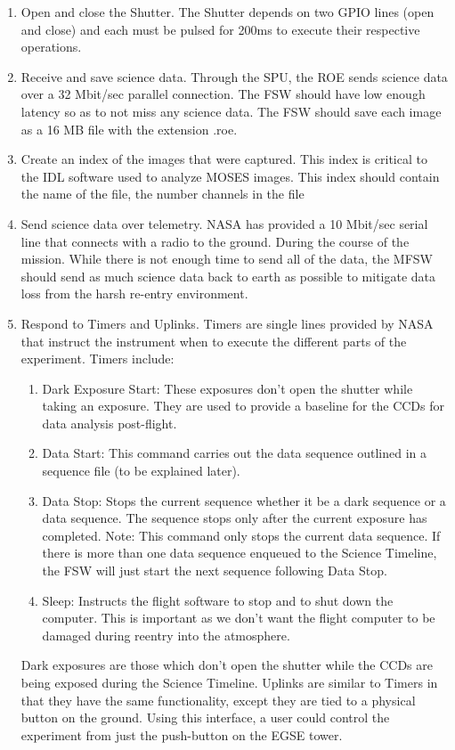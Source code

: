 \begin{enumerate}
  \item Open and close the Shutter. The Shutter depends on two GPIO lines (open and close) and each must be pulsed for 200ms to execute their respective operations.

  \item Receive and save science data. Through the SPU, the ROE sends science data over a 32 Mbit/sec parallel connection. The FSW should have low enough latency so as to not miss any science data. The FSW should save each image as a 16 MB file with the extension .roe.
  
  \item Create an index of the images that were captured. This index is critical to the IDL software used to analyze MOSES images. This index should contain the name of the file, the number channels in the file

  \item Send science data over telemetry. NASA has provided a 10 Mbit/sec serial line that connects with a radio to the ground. During the course of the mission. While there is not enough time to send all of the data, the MFSW should send as much science data back to earth as possible to mitigate data loss from the harsh re-entry environment.

  \item Respond to Timers and Uplinks. Timers are single lines provided by NASA that instruct the instrument when to execute the different parts of the experiment. Timers include: 
	\begin{enumerate}
		\item Dark Exposure Start: These exposures don't open the shutter while taking an exposure. They are used to provide a baseline for the CCDs for data analysis post-flight.
		\item Data Start: This command carries out the data sequence outlined in a sequence file (to be explained later).
		\item Data Stop: Stops the current sequence whether it be a dark sequence or a data sequence. The sequence stops only after the current exposure has completed. Note: This command only stops the current data sequence. If there is more than one data sequence enqueued to the Science Timeline, the FSW will just start the next sequence following Data Stop.
		\item Sleep: Instructs the flight software to stop and to shut down the computer. This is important as we don't want the flight computer to be damaged during reentry into the atmosphere.
	\end{enumerate}
 Dark exposures are those which don't open the shutter while the CCDs are being exposed during the Science Timeline. Uplinks are similar to Timers in that they have the same functionality, except they are tied to a physical button on the ground. Using this interface, a user could control the experiment from just the push-button on the EGSE tower. 


\end{enumerate}
